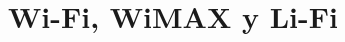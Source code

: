 \documentclass[10pt,journal,compsoc]{IEEEtran}
\begin{document}
%
\title{Wi-Fi, WiMAX y Li-Fi}
%
%
%
%



% 
%
\end{document}
